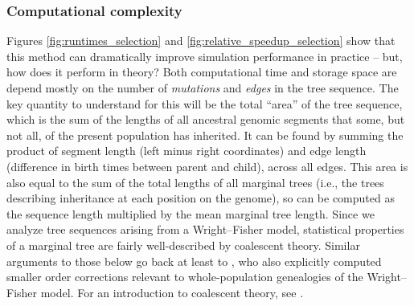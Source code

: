 \documentclass{article}
\begin{document}
\subsubsection*{Computational complexity}

Figures \ref{fig:runtimes_selection} and \ref{fig:relative_speedup_selection} show that this method
can dramatically improve simulation performance in practice --
but, how does it perform in theory?
Both computational time and storage space are depend mostly
on the number of \emph{mutations} and \emph{edges} in the tree sequence.
The key quantity to understand for this will be the total ``area'' of the tree sequence,
which is the sum of the lengths of all ancestral genomic segments that some, but not all,
of the present population has inherited.
It can be found by summing the product of segment length (left minus right coordinates)
and edge length (difference in birth times between parent and child),
across all edges.
This area is also equal to the sum of the total lengths of all marginal trees
(i.e., the trees describing inheritance at each position on the genome),
so can be computed as the sequence length multiplied by the mean marginal tree length.
Since we analyze tree sequences arising from a Wright--Fisher model,
statistical properties of a marginal tree are fairly well-described by coalescent theory.
Similar arguments to those below go back at least to \citet{watterson1975number},
who also explicitly computed smaller order corrections relevant to whole-population genealogies
of the Wright--Fisher model.
For an introduction to coalescent theory, see \citet{wakeley2005coalescent}.
\end{document}

